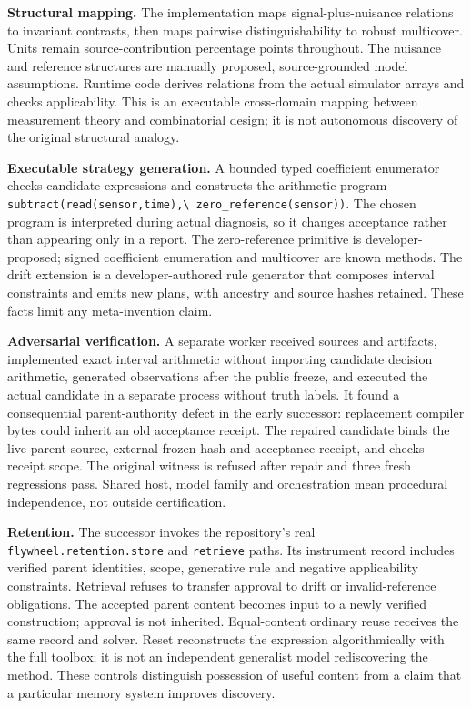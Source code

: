 \documentclass[
  11pt,
]{article}
\begin{document}
\textbf{Structural mapping.} The implementation maps
signal-plus-nuisance relations to invariant contrasts, then maps
pairwise distinguishability to robust multicover. Units remain
source-contribution percentage points throughout. The nuisance and
reference structures are manually proposed, source-grounded model
assumptions. Runtime code derives relations from the actual simulator
arrays and checks applicability. This is an executable cross-domain
mapping between measurement theory and combinatorial design; it is not
autonomous discovery of the original structural analogy.

\textbf{Executable strategy generation.} A bounded typed coefficient
enumerator checks candidate expressions and constructs the arithmetic
program \nolinkurl{subtract(read(sensor,time),\ zero_reference(sensor))}.
The chosen program is interpreted during actual diagnosis, so it changes
acceptance rather than appearing only in a report. The zero-reference
primitive is developer-proposed; signed coefficient enumeration and
multicover are known methods. The drift extension is a
developer-authored rule generator that composes interval constraints and
emits new plans, with ancestry and source hashes retained. These facts
limit any meta-invention claim.

\textbf{Adversarial verification.} A separate worker received sources
and artifacts, implemented exact interval arithmetic without importing
candidate decision arithmetic, generated observations after the public
freeze, and executed the actual candidate in a separate process without
truth labels. It found a consequential parent-authority defect in the
early successor: replacement compiler bytes could inherit an old
acceptance receipt. The repaired candidate binds the live parent source,
external frozen hash and acceptance receipt, and checks receipt scope.
The original witness is refused after repair and three fresh regressions
pass. Shared host, model family and orchestration mean procedural
independence, not outside certification.

\textbf{Retention.} The successor invokes the repository's real
\texttt{flywheel.retention.store} and \texttt{retrieve} paths. Its
instrument record includes verified parent identities, scope, generative
rule and negative applicability constraints. Retrieval refuses to
transfer approval to drift or invalid-reference obligations. The
accepted parent content becomes input to a newly verified construction;
approval is not inherited. Equal-content ordinary reuse receives the
same record and solver. Reset reconstructs the expression
algorithmically with the full toolbox; it is not an independent
generalist model rediscovering the method. These controls distinguish
possession of useful content from a claim that a particular memory
system improves discovery.
\end{document}
